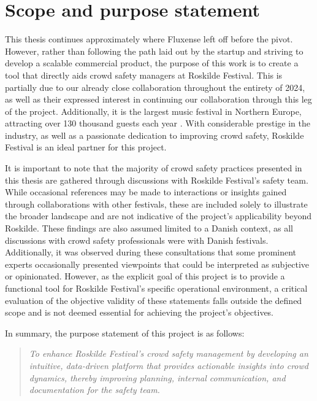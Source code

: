 \section{Scope and purpose statement}
\label{sec:mission-statement}

This thesis continues approximately where Fluxense left off before the pivot. However, rather than following the path laid out by the startup and striving to develop a scalable commercial product, the purpose of this work is to create a tool that directly aids crowd safety managers at Roskilde Festival. This is partially due to our already close collaboration throughout the entirety of 2024, as well as their expressed interest in continuing our collaboration through this leg of the project. Additionally, it is the largest music festival in Northern Europe, attracting over 130 thousand guests each year \cite{rf}. With considerable prestige in the industry, as well as a passionate dedication to improving crowd safety, Roskilde Festival is an ideal partner for this project.

It is important to note that the majority of crowd safety practices presented in this thesis are gathered through discussions with Roskilde Festival's safety team. While occasional references may be made to interactions or insights gained through collaborations with other festivals, these are included solely to illustrate the broader landscape and are not indicative of the project's applicability beyond Roskilde. These findings are also assumed limited to a Danish context, as all discussions with crowd safety professionals were with Danish festivals. Additionally, it was observed during these consultations that some prominent experts occasionally presented viewpoints that could be interpreted as subjective or opinionated. However, as the explicit goal of this project is to provide a functional tool for Roskilde Festival's specific operational environment, a critical evaluation of the objective validity of these statements falls outside the defined scope and is not deemed essential for achieving the project's objectives.

In summary, the purpose statement of this project is as follows:
\begin{quote}
  \textit{To enhance Roskilde Festival's crowd safety management by developing an intuitive, data-driven platform that provides actionable insights into crowd dynamics, thereby improving planning, internal communication, and documentation for the safety team.}
\end{quote}

